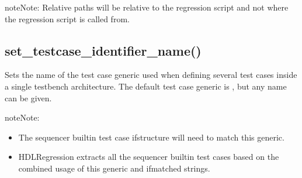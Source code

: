 \documentclass[letterpaper,10pt,english]{sphinxmanual}
\begin{document}
\begin{sphinxadmonition}{note}{Note:}
\sphinxAtStartPar
Relative paths will be relative to the regression script
and not where the regression script is called from.
\end{sphinxadmonition}


\subsection{set\_testcase\_identifier\_name()}
\label{\detokenize{api:set-testcase-identifier-name}}
\sphinxAtStartPar
Sets the name of the test case generic used when defining several test cases
inside a single testbench architecture. The default test case generic is ,
but any name can be given.

\begin{sphinxadmonition}{note}{Note:}\begin{itemize}
\item {} 
\sphinxAtStartPar
The sequencer built\sphinxhyphen{}in test case if\sphinxhyphen{}structure will need to match this generic.

\item {} 
\sphinxAtStartPar
HDLRegression extracts all the sequencer built\sphinxhyphen{}in test cases based on the combined usage of this generic
and if\sphinxhyphen{}matched strings.

\end{itemize}
\end{sphinxadmonition}

\begin{sphinxVerbatim}[commandchars=\\\{\}]
\end{sphinxVerbatim}
\end{document}
